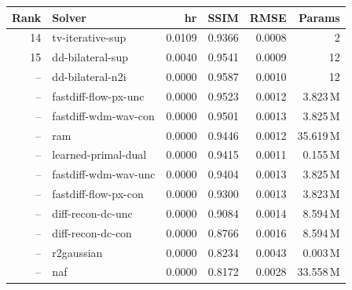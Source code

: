 \documentclass[AMA,twocolumn]{USG}
\begin{document}
\begin{table}[tb]
\begin{minipage}[t]{0.49\textwidth}
\begin{tabular}{@{}rlrrrr@{}}
\toprule
\textbf{Rank} & \textbf{Solver} & \textbf{hr} & \textbf{SSIM} & \textbf{RMSE} & \textbf{Params} \\
\midrule
14 & tv-iterative-sup     & 0.0109 & 0.9366 & 0.0008 & 2 \\
15 & dd-bilateral-sup     & 0.0040 & 0.9541 & 0.0009 & 12 \\
-- & dd-bilateral-n2i     & 0.0000 & 0.9587 & 0.0010 & 12 \\
-- & fastdiff-flow-px-unc & 0.0000 & 0.9523 & 0.0012 & 3.823\,M \\
-- & fastdiff-wdm-wav-con & 0.0000 & 0.9501 & 0.0013 & 3.825\,M \\
-- & ram                  & 0.0000 & 0.9446 & 0.0012 & 35.619\,M \\
-- & learned-primal-dual  & 0.0000 & 0.9415 & 0.0011 & 0.155\,M \\
-- & fastdiff-wdm-wav-unc & 0.0000 & 0.9404 & 0.0013 & 3.825\,M \\
-- & fastdiff-flow-px-con & 0.0000 & 0.9300 & 0.0013 & 3.823\,M \\
-- & diff-recon-dc-unc    & 0.0000 & 0.9084 & 0.0014 & 8.594\,M \\
-- & diff-recon-dc-con    & 0.0000 & 0.8766 & 0.0016 & 8.594\,M \\
-- & r2gaussian           & 0.0000 & 0.8234 & 0.0043 & 0.003\,M \\
-- & naf                  & 0.0000 & 0.8172 & 0.0028 & 33.558\,M \\
\bottomrule
\end{tabular}
\end{minipage}
\end{table}
\end{document}
